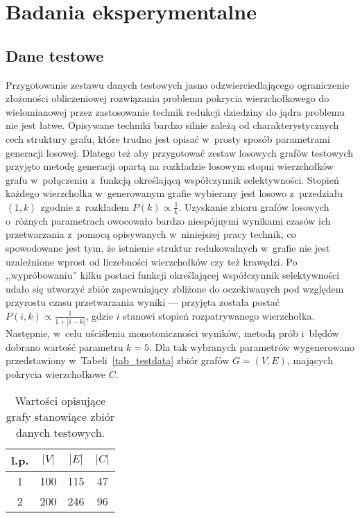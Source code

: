 \chapter{Badania eksperymentalne}
\label{results}
\section{Dane testowe}
\par{
  Przygotowanie zestawu danych testowych jasno odzwierciedlającego ograniczenie złożoności obliczeniowej rozwiązania problemu pokrycia wierzchołkowego do wielomianowej przez zastosowanie technik redukcji dziedziny do jądra problemu nie jest łatwe.
  Opisywane techniki bardzo silnie zależą od charakterystycznych cech struktury grafu, które trudno jest opisać w~prosty sposób parametrami generacji losowej.
  Dlatego też aby przygotować zestaw losowych grafów testowych przyjęto metodę generacji opartą na rozkładzie losowym stopni wierzchołków grafu w~połączeniu z~funkcją określającą współczynnik selektywności.
  Stopień każdego wierzchołka w~generowanym grafie wybierany jest losowo z~przedziału $\left<1, k\right>$ zgodnie z~rozkładem $P(k) \propto \frac{1}{k}$.
  Uzyskanie zbioru grafów losowych o~różnych parametrach owocowało bardzo niespójnymi wynikami czasów ich przetwarzania z~pomocą opisywanych w~niniejszej pracy technik, co spowodowane jest tym, że istnienie struktur redukowalnych w~grafie nie jest uzależnione wprost od liczebności wierzchołków czy też krawędzi.
  Po ,,wypróbowaniu'' kilku postaci funkcji określającej współczynnik selektywności udało się utworzyć zbiór zapewniający zbliżone do oczekiwanych pod względem przyrostu czasu przetwarzania wyniki --- przyjęta została postać $P(i, k) \propto \frac{1}{1+|i-k|}$, gdzie $i$ stanowi stopień rozpatrywanego wierzchołka.
  Następnie, w~celu uściślenia monotoniczności wyników, metodą prób i~błędów dobrano wartość parametru $k=5$.
  Dla tak wybranych parametrów wygenerowano przedstawiony w~Tabeli~\ref{tab_testdata} zbiór grafów $G=(V, E)$, mających pokrycia wierzchołkowe $C$.\\
  \begin{table}
    \begin{center}
    \caption{Wartości opisujące grafy stanowiące zbiór danych testowych.}
    \begin{tabular}{| c | c | c | c |}
      \hline
      l.p. & $|V|$ & $|E|$ & $|C|$ \\ \hline
      1 & 100 & 115 & 47 \\
      2 & 200 & 246 & 96 \\

\end{tabular}
\end{center}
\end{table}}
